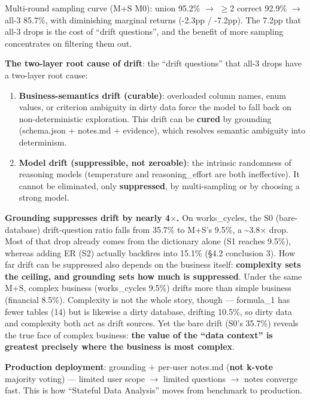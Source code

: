 \documentclass[11pt]{article}
\begin{document}
Multi-round sampling curve (M+S M0): union 95.2\% $\rightarrow$ $\geq$2 correct 92.9\% $\rightarrow$ all-3 85.7\%, with diminishing marginal returns (-2.3pp / -7.2pp). The 7.2pp that all-3 drops is the cost of ``drift questions'', and the benefit of more sampling concentrates on filtering them out.

\textbf{The two-layer root cause of drift}: the ``drift questions'' that all-3 drops have a two-layer root cause:

\begin{enumerate}
\def\labelenumi{\arabic{enumi}.}
\item
  \textbf{Business-semantics drift (curable)}: overloaded column names, enum values, or criterion ambiguity in dirty data force the model to fall back on non-deterministic exploration. This drift can be \textbf{cured} by grounding (schema.json + notes.md + evidence), which resolves semantic ambiguity into determinism.
\item
  \textbf{Model drift (suppressible, not zeroable)}: the intrinsic randomness of reasoning models (temperature and reasoning\_effort are both ineffective). It cannot be eliminated, only \textbf{suppressed}, by multi-sampling or by choosing a strong model.
\end{enumerate}

\textbf{Grounding suppresses drift by nearly 4$\times$.} On works\_cycles, the S0 (bare-database) drift-question ratio falls from 35.7\% to M+S's 9.5\%, a \textasciitilde3.8$\times$ drop. Most of that drop already comes from the dictionary alone (S1 reaches 9.5\%), whereas adding ER (S2) actually backfires into 15.1\% (\S{}4.2 conclusion 3). How far drift can be suppressed also depends on the business itself: \textbf{complexity sets the ceiling, and grounding sets how much is suppressed}. Under the same M+S, complex business (works\_cycles 9.5\%) drifts more than simple business (financial 8.5\%). Complexity is not the whole story, though --- formula\_1 has fewer tables (14) but is likewise a dirty database, drifting 10.5\%, so dirty data and complexity both act as drift sources. Yet the bare drift (S0's 35.7\%) reveals the true face of complex business: \textbf{the value of the ``data context'' is greatest precisely where the business is most complex}.

\textbf{Production deployment}: grounding + per-user notes.md (\textbf{not k-vote} majority voting) --- limited user scope $\rightarrow$ limited questions $\rightarrow$ notes converge fast. This is how ``Stateful Data Analysis'' moves from benchmark to production.
\end{document}
